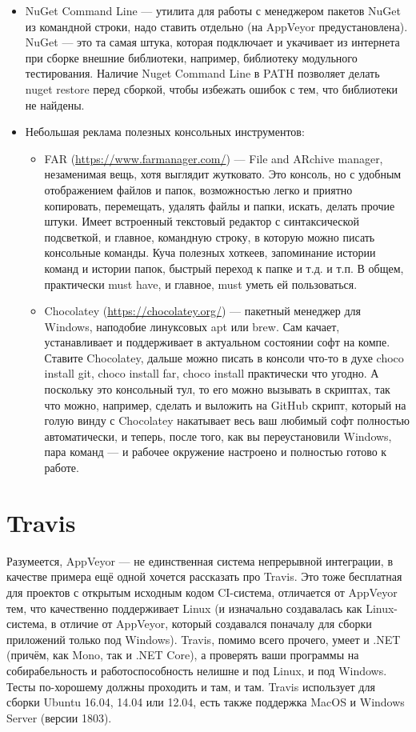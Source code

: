 \documentclass[a5paper]{article}
\begin{document}
\begin{itemize}
	\item NuGet Command Line --- утилита для работы с менеджером пакетов NuGet из командной строки, надо ставить отдельно (на AppVeyor предустановлена). NuGet --- это та самая штука, которая подключает и укачивает из интернета при сборке внешние библиотеки, например, библиотеку модульного тестирования. Наличие Nuget Command Line в PATH позволяет делать nuget restore перед сборкой, чтобы избежать ошибок с тем, что библиотеки не найдены.
	\item Небольшая реклама полезных консольных инструментов:
	\begin{itemize}
		\item FAR (\url{https://www.farmanager.com/}) --- File and ARchive manager, незаменимая вещь, хотя выглядит жутковато. Это консоль, но с удобным отображением файлов и папок, возможностью легко и приятно копировать, перемещать, удалять файлы и папки, искать, делать прочие штуки. Имеет встроенный текстовый редактор с синтаксической подсветкой, и главное, командную строку, в которую можно писать консольные команды. Куча полезных хоткеев, запоминание истории команд и истории папок, быстрый переход к папке и т.д. и т.п. В общем, практически must have, и главное, must уметь ей пользоваться.
		\item Chocolatey (\url{https://chocolatey.org/}) --- пакетный менеджер для Windows, наподобие линуксовых apt или brew. Сам качает, устанавливает и поддерживает в актуальном состоянии софт на компе. Ставите Chocolatey, дальше можно писать в консоли что-то в духе choco install git, choco install far, choco install практически что угодно. А поскольку это консольный тул, то его можно вызывать в скриптах, так что можно, например, сделать и выложить на GitHub скрипт, который на голую винду с Chocolatey накатывает весь ваш любимый софт полностью автоматически, и теперь, после того, как вы переустановили Windows, пара команд --- и рабочее окружение настроено и полностью готово к работе.
	\end{itemize}
\end{itemize}

\section{Travis}

Разумеется, AppVeyor --- не единственная система непрерывной интеграции, в качестве примера ещё одной хочется рассказать про Travis. Это тоже бесплатная для проектов с открытым исходным кодом CI-система, отличается от AppVeyor тем, что качественно поддерживает Linux (и изначально создавалась как Linux-система, в отличие от AppVeyor, который создавался поначалу для сборки приложений только под Windows). Travis, помимо всего прочего, умеет и .NET (причём, как Mono, так и .NET Core), а проверять ваши программы на собирабельность и работоспособность нелишне и под Linux, и под Windows. Тесты по-хорошему должны проходить и там, и там. Travis использует для сборки Ubuntu 16.04, 14.04 или 12.04, есть также поддержка MacOS и Windows Server (версии 1803).
\end{document}
